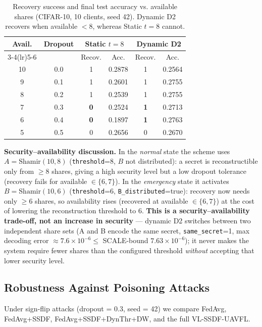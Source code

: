 \documentclass[10pt,conference]{IEEEtran}
\begin{document}
\begin{table}[t]
\caption{Recovery success and final test accuracy vs. available shares (CIFAR-10, 10 clients, seed 42). Dynamic D2 recovers when available $<8$, whereas Static $t=8$ cannot.}
\label{tab:rec_threshold}
\centering
\small
\begin{tabular}{cc|cc|cc}
\toprule
Avail. & Dropout & \multicolumn{2}{c}{Static $t{=}8$} & \multicolumn{2}{c}{Dynamic D2}\\
\cmidrule(lr){3-4}\cmidrule(lr){5-6}
 & & Recov. & Acc. & Recov. & Acc.\\
\midrule
10 & 0.0 & 1 & 0.2878 & 1 & 0.2564\\
9  & 0.1 & 1 & 0.2601 & 1 & 0.2755\\
8  & 0.2 & 1 & 0.2539 & 1 & 0.2755\\
7  & 0.3 & \textbf{0} & 0.2524 & \textbf{1} & 0.2713\\
6  & 0.4 & \textbf{0} & 0.1897 & \textbf{1} & 0.2763\\
5  & 0.5 & 0 & 0.2656 & 0 & 0.2670\\
\bottomrule
\end{tabular}
\end{table}

\textbf{Security--availability discussion.} In the \emph{normal} state the scheme uses $A=\mathrm{Shamir}(10,8)$ (\texttt{threshold}=8, $B$ not distributed): a secret is reconstructible only from $\ge 8$ shares, giving a high security level but a low dropout tolerance (recovery fails for available $\in\{6,7\}$). In the \emph{emergency} state it activates $B=\mathrm{Shamir}(10,6)$ (\texttt{threshold}=6, \texttt{B\_distributed}=true): recovery now needs only $\ge 6$ shares, so availability rises (recovered at available $\in\{6,7\}$) at the cost of lowering the reconstruction threshold to 6. \textbf{This is a security--availability trade-off, not an increase in security} --- dynamic D2 switches between two independent share sets (A and B encode the same secret, \texttt{same\_secret}=1, max decoding error $\approx 7.6\times10^{-6}\le$ SCALE-bound $7.63\times10^{-6}$); it never makes the system require fewer shares than the configured threshold \emph{without} accepting that lower security level.

\subsection{Robustness Against Poisoning Attacks}

Under sign-flip attacks (dropout = 0.3, seed = 42) we compare FedAvg, FedAvg+SSDF, FedAvg+SSDF+DynThr+DW, and the full VL-SSDF-UAVFL.
\end{document}
